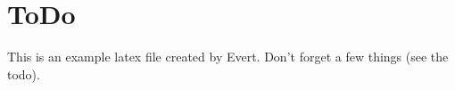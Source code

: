 \section*{ToDo}
This is an example latex file created by Evert. Don't forget a few things (see the todo).
\bigskip
\listoftodos
\clearpage
